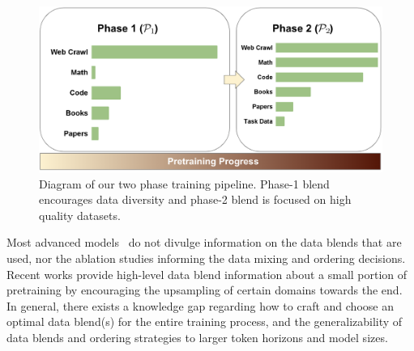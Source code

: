 \documentclass[11pt]{article}
\newcommand{\todo}[1]{{\color{red}\bf [TODO: #1]}\xspace}
\newcommand{\citereq}[1]{{\color{blue}\bf [CITE]}\xspace}
\begin{document}
\begin{figure}[t]
    \centering
    \includegraphics[width=1.0\textwidth]{figures/curriculum-fig.png}
    \caption{Diagram of our two phase training pipeline. Phase-1 blend encourages data diversity and phase-2 blend is focused on high quality datasets.
    } \label{fig:train_pipeline}
\end{figure}

Most advanced models~\cite{gpt4-openai2024gpt4technicalreport,llama3-dubey2024llama3herdmodels} do not divulge information on the data blends that are used, nor the ablation studies informing the data mixing and ordering decisions. %
Recent works \cite{domain-upsampling-blakeney2024doesdatasparkjoy,olmo-groeneveld-etal-2024-olmo,llama3-dubey2024llama3herdmodels,snowflake-arctic} provide high-level data blend information about a small portion of pretraining by encouraging the upsampling of certain domains towards the end.
In general, there exists a knowledge gap regarding how to craft and choose an optimal data blend(s) for the entire training process, and the generalizability of data blends and ordering strategies to larger token horizons and model sizes.

\end{document}
